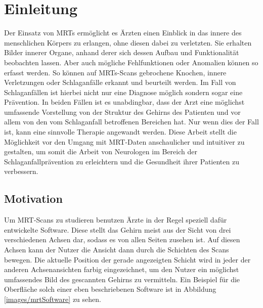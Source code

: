 
\chapter{Einleitung}

Der Einsatz von MRTs ermöglicht es Ärzten einen Einblick in das innere des menschlichen Körpers zu erlangen, ohne diesen dabei zu verletzten. Sie erhalten Bilder innerer Organe, anhand derer sich dessen Aufbau und Funktionalität beobachten lassen. Aber auch mögliche Fehlfunktionen oder Anomalien können so erfasst werden. So können auf MRTs-Scans gebrochene Knochen, innere Verletzungen oder Schlaganfälle erkannt und beurteilt werden. Im Fall von Schlaganfällen ist hierbei nicht nur eine Diagnose möglich sondern sogar eine Prävention. 
In beiden Fällen ist es unabdingbar, dass der Arzt eine möglichst umfassende Vorstellung von der Struktur des Gehirns des Patienten und vor allem von den vom Schlaganfall betroffenen Bereichen hat. Nur wenn dies der Fall ist, kann eine sinnvolle Therapie angewandt werden.
Diese Arbeit stellt die Möglichkeit vor den Umgang mit MRT-Daten anschaulicher und intuitiver zu gestalten, um somit die Arbeit von Neurologen im Bereich der Schlaganfallprävention zu erleichtern und die Gesundheit ihrer Patienten zu verbessern.

\section{Motivation}
\label{motivation}

Um MRT-Scans zu studieren benutzen Ärzte in der Regel speziell dafür entwickelte Software. Diese stellt das Gehirn meist aus der Sicht von drei verschiedenen Achsen dar, sodass es von allen Seiten zusehen ist. Auf diesen Achsen kann der Nutzer die Ansicht dann durch die Schichten des Scans bewegen. Die aktuelle Position der gerade angezeigten Schicht wird in jeder der anderen Achsenansichten farbig eingezeichnet, um den Nutzer ein möglichst umfassendes Bild des gescannten Gehirns zu vermitteln. 
Ein Beispiel für die Oberfläche solch einer eben beschriebenen Software ist in Abbildung \ref{images/mrtSoftware} zu sehen. 

